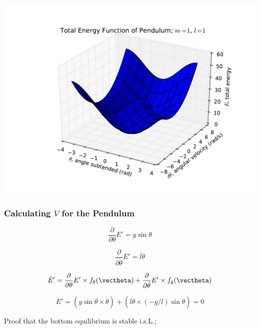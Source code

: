 \documentclass[12pt]{beamer}
\begin{document}
\begin{frame}
\centering
\includegraphics[width=.9\linewidth]{pendulum_energy}
\end{frame}







\begin{frame}
\frametitle{Calculating $\dot V$ for the Pendulum}

\[
\frac{\partial}{\partial\theta} E' = g \sin \theta
\]

\[
\frac{\partial}{\partial\dot\theta} E' = l \dot\theta
\]

\[
\dot E' =
	\frac{\partial}{\partial\theta} E' 
		\times f_{\theta}(\vectheta)
	+ \frac{\partial}{\partial\dot\theta} E'
		\times f_{\dot\theta}(\vectheta)
\]

\[
\dot E' =
	\left( g \sin\theta \times \dot\theta \right)
	+ \left( l \dot\theta \times (-g/l) \sin \theta \right) = 0
\]

\begin{itemize}
\vitem
Proof that the bottom equilibrium is stable i.s.L.;

\end{itemize}

\vfill\null

\end{frame}
\end{document}
